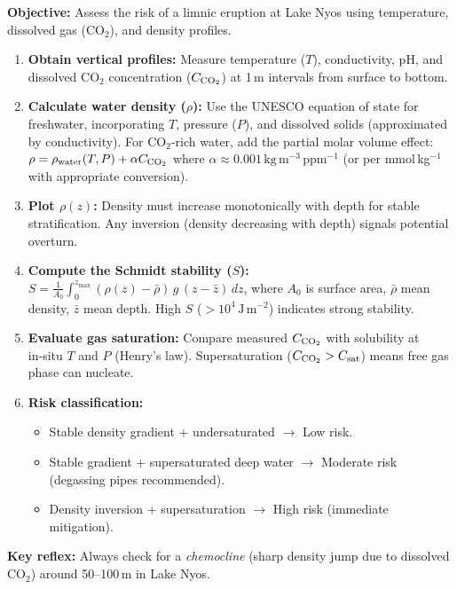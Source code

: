 \documentclass[11pt]{article}
\begin{document}
\begin{methode}
\textbf{Objective:} Assess the risk of a limnic eruption at Lake Nyos using temperature, dissolved gas (CO$_2$), and density profiles.
\begin{enumerate}
\item \textbf{Obtain vertical profiles:} Measure temperature ($T$), conductivity, pH, and dissolved CO$_2$ concentration ($C_{\ce{CO2}}$) at 1\,m intervals from surface to bottom.
\item \textbf{Calculate water density ($\rho$):} Use the UNESCO equation of state for freshwater, incorporating $T$, pressure ($P$), and dissolved solids (approximated by conductivity). For CO$_2$-rich water, add the partial molar volume effect: $\rho = \rho_{\text{water}}(T,P) + \alpha C_{\ce{CO2}}$ where $\alpha \approx 0.001\,\mathrm{kg\,m^{-3}\,ppm^{-1}}$ (or per mmol\,kg$^{-1}$ with appropriate conversion).
\item \textbf{Plot $\rho(z)$:} Density must increase monotonically with depth for stable stratification. Any inversion (density decreasing with depth) signals potential overturn.
\item \textbf{Compute the Schmidt stability ($S$):} $S = \frac{1}{A_0}\int_0^{z_{\max}} (\rho(z)-\bar{\rho})\,g\,(z-\bar{z})\,dz$, where $A_0$ is surface area, $\bar{\rho}$ mean density, $\bar{z}$ mean depth. High $S$ ($>10^4\,\mathrm{J\,m^{-2}}$) indicates strong stability.
\item \textbf{Evaluate gas saturation:} Compare measured $C_{\ce{CO2}}$ with solubility at in‑situ $T$ and $P$ (Henry's law). Supersaturation ($C_{\ce{CO2}} > C_{\text{sat}}$) means free gas phase can nucleate.
\item \textbf{Risk classification:} 
\begin{itemize}
\item Stable density gradient + undersaturated $\rightarrow$ Low risk.
\item Stable gradient + supersaturated deep water $\rightarrow$ Moderate risk (degassing pipes recommended).
\item Density inversion + supersaturation $\rightarrow$ High risk (immediate mitigation).
\end{itemize}
\end{enumerate}
\textbf{Key reflex:} Always check for a \emph{chemocline} (sharp density jump due to dissolved CO$_2$) around 50–100\,m in Lake Nyos.
\end{methode}
\end{document}
